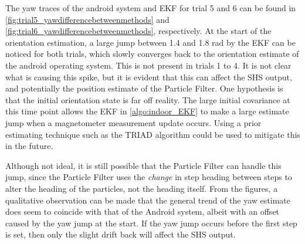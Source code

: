 The yaw traces of the android system and EKF for trial 5 and 6 can be found in \cref{fig:trial5_yawdifferencebetweenmethods} and \cref{fig:trial6_yawdifferencebetweenmethods}, respectively. At the start of the orientation estimation, a large jump between 1.4 and 1.8 rad by the EKF can be noticed for both trials, which slowly converges back to the orientation estimate of the android operating system. This is not present in trials 1 to 4. It is not clear what is causing this spike, but it is evident that this can affect the SHS output, and potentially the position estimate of the Particle Filter. One hypothesis is that the initial orientation state is far off reality. The large initial covariance at this time point allows the EKF in \cref{algo:indoor_EKF} to make a large estimate jump when a magnetometer measurement update occurs. Using a prior estimating technique such as the TRIAD algorithm \cite{Kok2017} could be used to mitigate this in the future. \par 

Although not ideal, it is still possible that the Particle Filter can handle this jump, since the Particle Filter uses the \textit{change} in step heading between steps to alter the heading of the particles, not the heading itself. From the figures, a qualitative observation can be made that the general trend of the yaw estimate does seem to coincide with that of the Android system, albeit with an offset caused by the yaw jump at the start. If the yaw jump occurs before the first step is set, then only the slight drift back will affect the \ac{SHS} output. \par 

